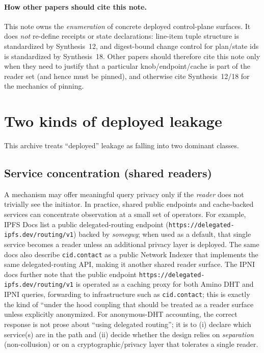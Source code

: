 \documentclass[11pt]{article}
\begin{document}
\paragraph{How other papers should cite this note.}
This note owns the \emph{enumeration} of concrete deployed control-plane surfaces.
It does \emph{not} re-define receipts or state declarations: line-item tuple structure is standardized by Synthesis~12, and digest-bound change control for plan/state ids is standardized by Synthesis~18.\cite{series:receiptitems,series:planstateequiv}
Other papers should therefore cite this note only when they need to justify that a particular knob/end\-point/cache is part of the reader set (and hence must be pinned), and otherwise cite Synthesis~12/18 for the mechanics of pinning.


\section{Two kinds of deployed leakage}
This archive treats ``deployed'' leakage as falling into two dominant classes.

\subsection{Service concentration (shared readers)}
A mechanism may offer meaningful query privacy only if the \emph{reader} does not trivially see the initiator.
In practice, shared public endpoints and cache-backed services can concentrate observation at a small set of operators.
For example, IPFS Docs list a public delegated-routing endpoint (\texttt{https://delegated-ipfs.dev/routing/v1}) backed by \emph{someguy}; when used as a default, that single service becomes a reader unless an additional privacy layer is deployed.\cite{ipfsDocsPublicUtilities,ipfsSomeguy}
The same docs also describe \texttt{cid.contact} as a public Network Indexer that implements the same delegated-routing API, making it another shared reader surface.\cite{ipfsDocsNodes}
The IPNI docs further note that the public endpoint \texttt{https://delegated-ipfs.dev/routing/v1} is operated as a caching proxy for both Amino DHT and IPNI queries, forwarding to infrastructure such as \texttt{cid.contact}; this is exactly the kind of ``under the hood coupling that should be treated as a reader surface unless explicitly anonymized.\cite{ipfsDocsIPNI,ipfsSomeguy}
For anonymous-DHT accounting, the correct response is not prose about ``using delegated routing''; it is to (i) declare which service(s) are in the path and (ii) decide whether the design relies on \emph{separation} (non-collusion) or on a cryptographic/privacy layer that tolerates a single reader.
\end{document}
